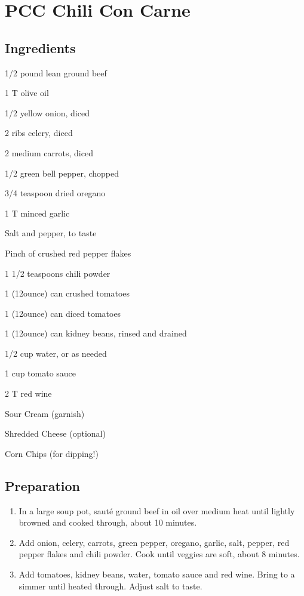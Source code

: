\documentclass[ansiapaper,10pt,english]{sphinxmanual}
\begin{document}
\chapter{PCC Chili Con Carne}
\label{\detokenize{PCC_Chili:pcc-chili-con-carne}}\label{\detokenize{PCC_Chili::doc}}

\section{Ingredients}
\label{\detokenize{PCC_Chili:ingredients}}
%
\begin{sphinxVerbatim}[commandchars=\\\{\}]
1/2 pound lean ground beef

1 T olive oil

1/2 yellow onion, diced

2 ribs celery, diced

2 medium carrots, diced

1/2 green bell pepper, chopped

3/4 teaspoon dried oregano

1 T minced garlic

Salt and pepper, to taste

Pinch of crushed red pepper flakes

1 1/2 teaspoons chili powder

1 (12\PYGZhy{}ounce) can crushed tomatoes

1 (12\PYGZhy{}ounce) can diced tomatoes

1 (12\PYGZhy{}ounce) can kidney beans, rinsed and drained

1/2 cup water, or as needed

1 cup tomato sauce

2 T red wine

Sour Cream (garnish)

Shredded Cheese (optional)

Corn Chips (for dipping!)
\end{sphinxVerbatim}


\section{Preparation}
\label{\detokenize{PCC_Chili:preparation}}\begin{enumerate}
\item {} 
In a large soup pot, sauté ground beef in oil over medium heat until lightly browned and cooked through, about 10 minutes.

\item {} 
Add onion, celery, carrots, green pepper, oregano, garlic, salt, pepper, red pepper flakes and chili powder. Cook until veggies are soft, about 8 minutes.

\item {} 
Add tomatoes, kidney beans, water, tomato sauce and red wine. Bring to a simmer until heated through. Adjust salt to taste.

\end{enumerate}
\end{document}
